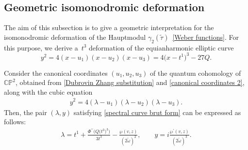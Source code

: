 \subsection{Geometric isomonodromic deformation}\label{Geometric Isomonodromic deformation}

The aim of this subsection is to give a geometric interpretation for the isomonodromic deformation of the Hauptmodul $\gamma_2(\tilde\tau)$~\eqref{Weber functions}. For this purpose, we derive a~$t^3$ deformation of the equianharmonic elliptic curve
\[
y^2=4(x-u_1)(x-u_2)(x-u_3)=4\bigl(x-t^1\bigr)^3-27Q.
\]

\begin{Lemma}
Consider the canonical coordinates $(u_1, u_2, u_3)$ of the quantum cohomology \linebreak of~$\mathbb{CP}^2$, obtained from \eqref{Dubrovin Zhang substitution} and \eqref{canonical coordinates 2}, along with the cubic equation
\begin{gather}\label{spectral curve brut form}
y^2 = 4( \lambda - u_1)( \lambda - u_2)( \lambda - u_3).
\end{gather}
Then, the pair $(\lambda,y)$ satisfying \eqref{spectral curve brut form} can be expressed as follows:
\begin{gather}
\lambda=t^1+\frac{\Phi^{\prime\prime}\bigl(Q\bigl(t^3\bigr)^3\bigr)}{3t^3}-\frac{\wp(v,z)}{(2\tilde\omega)^2},\qquad
y=i\frac{\wp^{\prime}(v,z)}{(2\tilde\omega)^3}.\label{LG superpotential elliptic form first piece}
\end{gather}
\end{Lemma}
